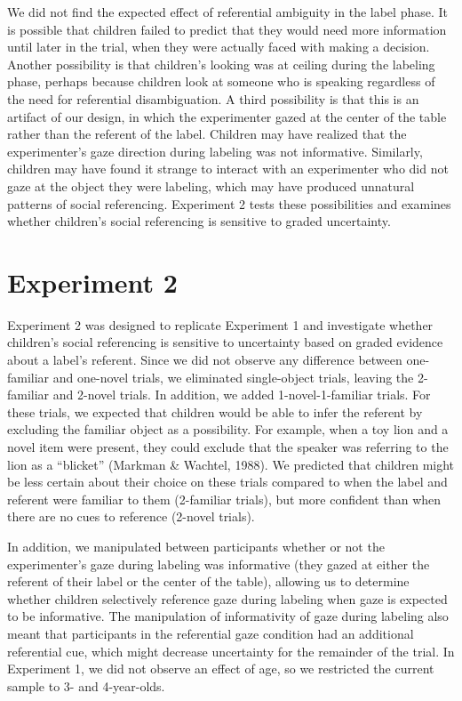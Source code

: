 \documentclass[10pt, letterpaper]{article}
\begin{document}
We did not find the expected effect of referential ambiguity in the
label phase. It is possible that children failed to predict that they
would need more information until later in the trial, when they were
actually faced with making a decision. Another possibility is that
children's looking was at ceiling during the labeling phase, perhaps
because children look at someone who is speaking regardless of the need
for referential disambiguation. A third possibility is that this is an
artifact of our design, in which the experimenter gazed at the center of
the table rather than the referent of the label. Children may have
realized that the experimenter's gaze direction during labeling was not
informative. Similarly, children may have found it strange to interact
with an experimenter who did not gaze at the object they were labeling,
which may have produced unnatural patterns of social referencing.
Experiment 2 tests these possibilities and examines whether children's
social referencing is sensitive to graded uncertainty.

\section{Experiment 2}\label{experiment-2}

Experiment 2 was designed to replicate Experiment 1 and investigate
whether children's social referencing is sensitive to uncertainty based
on graded evidence about a label's referent. Since we did not observe
any difference between one-familiar and one-novel trials, we eliminated
single-object trials, leaving the 2-familiar and 2-novel trials. In
addition, we added 1-novel-1-familiar trials. For these trials, we
expected that children would be able to infer the referent by excluding
the familiar object as a possibility. For example, when a toy lion and a
novel item were present, they could exclude that the speaker was
referring to the lion as a ``blicket'' (Markman \& Wachtel, 1988). We
predicted that children might be less certain about their choice on
these trials compared to when the label and referent were familiar to
them (2-familiar trials), but more confident than when there are no cues
to reference (2-novel trials).

In addition, we manipulated between participants whether or not the
experimenter's gaze during labeling was informative (they gazed at
either the referent of their label or the center of the table), allowing
us to determine whether children selectively reference gaze during
labeling when gaze is expected to be informative. The manipulation of
informativity of gaze during labeling also meant that participants in
the referential gaze condition had an additional referential cue, which
might decrease uncertainty for the remainder of the trial. In Experiment
1, we did not observe an effect of age, so we restricted the current
sample to 3- and 4-year-olds.
\end{document}
